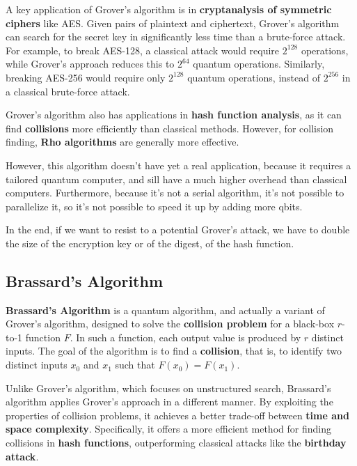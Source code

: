 A key application of Grover's algorithm is in \textbf{cryptanalysis of
symmetric ciphers} like AES. Given pairs of plaintext and ciphertext,
Grover's algorithm can search for the secret key in significantly less
time than a brute-force attack. For example, to break AES-128, a
classical attack would require \(2^{128}\) operations, while Grover's
approach reduces this to \(2^{64}\) quantum operations. Similarly,
breaking AES-256 would require only \(2^{128}\) quantum operations,
instead of \(2^{256}\) in a classical brute-force attack.

Grover's algorithm also has applications in \textbf{hash function
analysis}, as it can find \textbf{collisions} more efficiently than
classical methods. However, for collision finding, \textbf{Rho
algorithms} are generally more effective. 

However, this algorithm doesn't have yet a real application, because 
it requires a tailored quantum computer, and sill have a much higher
overhead than classical computers. Furthermore, because it's not a
serial algorithm, it's not possible to parallelize it, so it's not
possible to speed it up by adding more qbits.

In the end, if we want to resist to a potential Grover's attack, we
have to double the size of the encryption key or of the digest, of the
hash function.

\subsection{Brassard's Algorithm}

\textbf{Brassard's Algorithm} is a quantum algorithm, and actually a
variant of Grover's algorithm, designed to solve the \textbf{collision
problem} for a black-box \(r\)-to-1 function \(F\). In such a
function, each output value is produced by \(r\) distinct inputs. The
goal of the algorithm is to find a \textbf{collision}, that is, to
identify two distinct inputs \(x_0\) and \(x_1\) such that \(F(x_0) =
F(x_1)\).

Unlike Grover's algorithm, which focuses on unstructured search,
Brassard's algorithm applies Grover's approach in a different manner.
By exploiting the properties of collision problems, it achieves a
better trade-off between \textbf{time and space complexity}.
Specifically, it offers a more efficient method for finding collisions
in \textbf{hash functions}, outperforming classical attacks like the
\textbf{birthday attack}.

